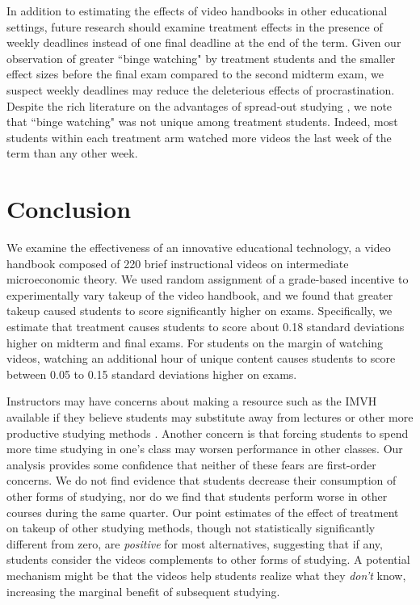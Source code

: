 \documentclass[12pt]{article}
\begin{document}
In addition to estimating the effects of video handbooks in other educational settings, future research should examine treatment effects in the presence of weekly deadlines instead of one final deadline at the end of the term. Given our observation of greater ``binge watching" by treatment students and the smaller effect sizes before the final exam compared to the second midterm exam, we suspect weekly deadlines may reduce the deleterious effects of procrastination. Despite the rich literature on the advantages of spread-out studying \parencite{kornell2009, cpvw2006}, we note that ``binge watching" was not unique among treatment students. Indeed, most students within each treatment arm watched more videos the last week of the term than any other week.


\section{Conclusion} \label{conclusion}

We examine the effectiveness of an innovative educational technology, a video handbook composed of 220 brief instructional videos on intermediate microeconomic theory. We used random assignment of a grade-based incentive to experimentally vary takeup of the video handbook, and we found that greater takeup caused students to score significantly higher on exams. Specifically, we estimate that treatment causes students to score about 0.18 standard deviations higher on midterm and final exams. For students on the margin of watching videos, watching an additional hour of unique content causes students to score between 0.05 to 0.15 standard deviations higher on exams.

Instructors may have concerns about making a resource such as the IMVH available if they believe students may substitute away from lectures or other more productive studying methods \textcite{kay2012}. Another concern is that forcing students to spend more time studying in one's class may worsen performance in other classes. Our analysis provides some confidence that neither of these fears are first-order concerns. We do not find evidence that students decrease their consumption of other forms of studying, nor do we find that students perform worse in other courses during the same quarter. Our point estimates of the effect of treatment on takeup of other studying methods, though not statistically significantly different from zero, are \textit{positive} for most alternatives, suggesting that if any, students consider the videos complements to other forms of studying. A potential mechanism might be that the videos help students realize what they \textit{don't} know, increasing the marginal benefit of subsequent studying.
\end{document}
